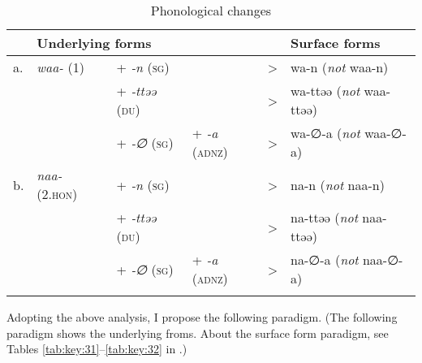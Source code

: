 \begin{table}
\caption{\label{tab:key:35}Phonological changes}
\begin{tabular}{ *{6}{l} }
\lsptoprule
   & \multicolumn{3}{l}{Underlying forms} & & \multicolumn{1}{l}{Surface forms}\\\midrule
a. & \textit{waa-} (1)     & +  \textit{{}-n}    (\textsc{sg}) &                        & > & wa-n    (\textit{not} waa-n)   \\
   &                       & +  \textit{{}-ttəə} (\textsc{du}) &                        & > & wa-ttəə (\textit{not} waa-ttəə)\\
   &                       & +  \textit{{}-∅}    (\textsc{sg}) & + \textit{{}-a} (\textsc{adnz}) & > & wa-∅-a  (\textit{not} waa-∅-a) \\
b. & \textit{naa-} (2.\textsc{hon}) & +  \textit{{}-n}    (\textsc{sg}) &                        & > & na-n    (\textit{not} naa-n)   \\
   &                       & +  \textit{{}-ttəə} (\textsc{du}) &                        & > & na-ttəə (\textit{not} naa-ttəə)\\
   &                       & +  \textit{{}-∅}    (\textsc{sg}) & + \textit{{}-a} (\textsc{adnz}) & > & na-∅-a  (\textit{not} naa-∅-a) \\
\lspbottomrule
\end{tabular}
\end{table}

\noindent Adopting the above analysis, I propose the following paradigm. (The following paradigm shows the underlying froms. About the surface form paradigm, see Tables \ref{tab:key:31}--\ref{tab:key:32} in .)

